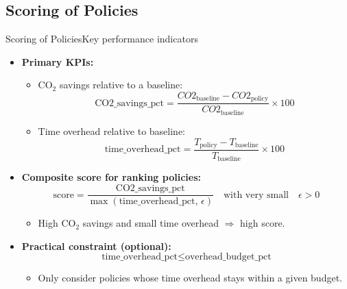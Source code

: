 \subsection{Scoring of Policies}

\begin{frame}[t]{Scoring of Policies}{Key performance indicators}

  \begin{itemize}
    \item \textbf{Primary KPIs:}
      \begin{itemize}
        \item CO$_2$ savings relative to a baseline:
          \[
            \text{CO2\_savings\_pct}
            = \frac{CO2_{\text{baseline}} -
            CO2_{\text{policy}}}{CO2_{\text{baseline}}} \times 100
          \]
        \item Time overhead relative to baseline:
          \[
            \text{time\_overhead\_pct}
            = \frac{T_{\text{policy}} -
            T_{\text{baseline}}}{T_{\text{baseline}}} \times 100
          \]
      \end{itemize}

      \vspace{0.2cm}
    \item \textbf{Composite score for ranking policies:}
      \[
        \text{score} =
        \frac{\text{CO2\_savings\_pct}}
        {\max(\text{time\_overhead\_pct}, \,\epsilon)}
        \quad\text{with very small}\quad \epsilon > 0
      \]
      \begin{itemize}
        \item High CO$_2$ savings and small time overhead
          $\Rightarrow$ high score.
      \end{itemize}

      \vspace{0.2cm}
    \item \textbf{Practical constraint (optional):}
      \[
        \text{time\_overhead\_pct} \leq \text{overhead\_budget\_pct}
      \]
      \begin{itemize}
        \item Only consider policies whose time overhead stays within
          a given budget.
      \end{itemize}
  \end{itemize}

\end{frame}
